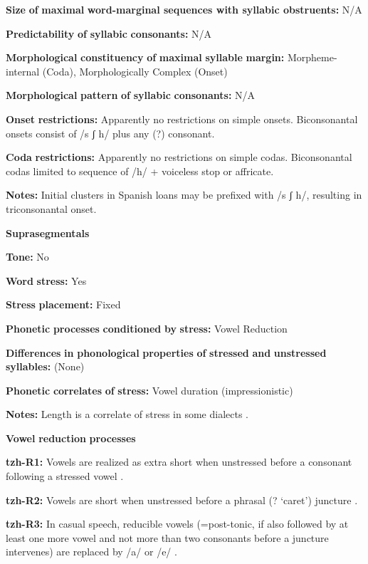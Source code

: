 \begin{styleBody}
\textbf{Size} \textbf{of} \textbf{maximal} \textbf{word{}-marginal sequences with syllabic obstruents:} N/A

\textbf{Predictability} \textbf{of} \textbf{syllabic} \textbf{consonants:} N/A

\textbf{Morphological} \textbf{constituency} \textbf{of} \textbf{maximal} \textbf{syllable} \textbf{margin:} Morpheme-internal (Coda), Morphologically Complex (Onset)

\textbf{Morphological} \textbf{pattern} \textbf{of} \textbf{syllabic} \textbf{consonants:} N/A

\textbf{Onset} \textbf{restrictions:} Apparently no restrictions on simple onsets. Biconsonantal onsets consist of /s ʃ h/ plus any (?) consonant.

\textbf{Coda} \textbf{restrictions:} Apparently no restrictions on simple codas. Biconsonantal codas limited to sequence of /h/ + voiceless stop or affricate.

\textbf{Notes:} Initial clusters in Spanish loans may be prefixed with /s ʃ h/, resulting in triconsonantal onset.

\textbf{Suprasegmentals}

\textbf{Tone:} No

\textbf{Word} \textbf{stress:} Yes

\textbf{Stress} \textbf{placement:} Fixed

\textbf{Phonetic} \textbf{processes} \textbf{conditioned} \textbf{by} \textbf{stress:} Vowel Reduction

\textbf{Differences} \textbf{in} \textbf{phonological} \textbf{properties} \textbf{of} \textbf{stressed} \textbf{and} \textbf{unstressed} \textbf{syllables:} (None)

\textbf{Phonetic} \textbf{correlates} \textbf{of} \textbf{stress:} Vowel duration (impressionistic)

\textbf{Notes:} Length is a correlate of stress in some dialects \citep[23]{Polian2006}.

\textbf{Vowel} \textbf{reduction} \textbf{processes}

\textbf{tzh-R1:} Vowels are realized as extra short when unstressed before a consonant following a stressed vowel \citep[12]{Kaufman1971}.

\textbf{tzh-R2:} Vowels are short when unstressed before a phrasal (? ‘caret’) juncture \citep[12]{Kaufman1971}.

\textbf{tzh-R3:} In casual speech, reducible vowels (=post-tonic, if also followed by at least one more vowel and not more than two consonants before a juncture intervenes) are replaced by /a/ or /e/ \citep[26-7]{Kaufman1971}.


\end{styleBody}
